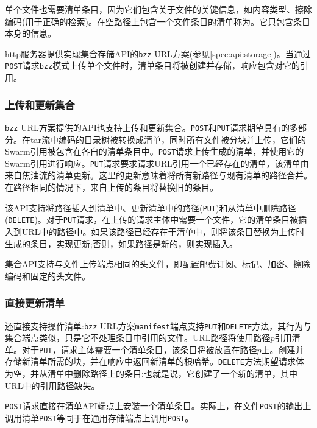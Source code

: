 单个文件也需要清单条目，因为它们包含关于文件的关键信息，如内容类型、擦除编码(用于正确的检索)。在空路径上包含一个文件条目的清单称为。它只包含条目本身的信息。

http服务器提供实现集合存储API的\lstinline{bzz} URL方案(参见\ref{spec:api:storage})。当通过\lstinline{POST}请求\lstinline{bzz}模式上传单个文件时，清单条目将被创建并存储，响应包含对它的引用。

\subsubsection{上传和更新集合}

\lstinline{bzz} URL方案提供的API也支持上传和更新集合。\lstinline{POST}和\lstinline{PUT}请求期望具有的多部分。在tar流中编码的目录树被转换成清单，同时所有文件被分块并上传，它们的Swarm引用被包含在各自的清单条目中。\lstinline{POST}请求上传生成的清单，并使用它的Swarm引用进行响应。\lstinline{PUT}请求要求请求URL引用一个已经存在的清单，该清单由来自焦油流的清单更新。这里的更新意味着将所有新路径与现有清单的路径合并。在路径相同的情况下，来自上传的条目将替换旧的条目。

该API支持将路径插入到清单中、更新清单中的路径(\lstinline{PUT})和从清单中删除路径(\lstinline{DELETE})。对于\lstinline{PUT}请求，在上传的请求主体中需要一个文件，它的清单条目被插入到URL中的路径中。如果该路径已经存在于清单中，则将该条目替换为上传时生成的条目，实现更新;否则，如果路径是新的，则实现插入。

集合API支持与文件上传端点相同的头文件，即配置邮费订阅、标记、加密、擦除编码和固定的头文件。

\subsubsection{直接更新清单}

还直接支持操作清单:\lstinline{bzz} URL方案\lstinline{manifest}端点支持\lstinline{PUT}和\lstinline{DELETE}方法，其行为与集合端点类似，只是它不处理条目中引用的文件。URL路径将使用路径$p$引用清单。对于\lstinline{PUT}，请求主体需要一个清单条目，该条目将被放置在路径$p$上。创建并存储新清单所需的块，并在响应中返回新清单的根哈希。\lstinline{DELETE}方法期望请求体为空，并从清单中删除路径上的条目:也就是说，它创建了一个新的清单，其中URL中的引用路径缺失。

\lstinline{POST}请求直接在清单API端点上安装一个清单条目。实际上，在文件\lstinline{POST}的输出上调用清单\lstinline{POST}等同于在通用存储端点上调用\lstinline{POST}。

